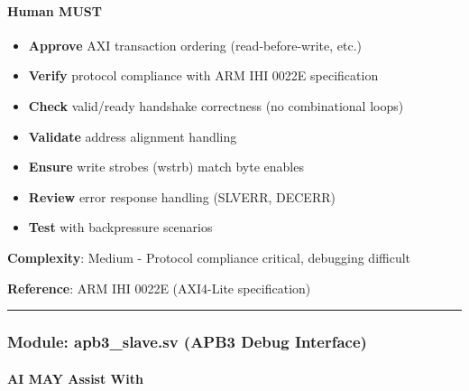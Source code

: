 \paragraph{\texorpdfstring{\hold{} Human MUST}{ Human MUST}}\label{cr:status:phase1-ai-human-responsibilities:raised-hand-human-must-6}

\begin{record}

\begin{itemize}
\tightlist
\item
  \textbf{Approve} AXI transaction ordering (read-before-write, etc.)
\item
  \textbf{Verify} protocol compliance with ARM IHI 0022E specification
\item
  \textbf{Check} valid/\allowbreak{}ready handshake correctness (no
  combinational loops)
\item
  \textbf{Validate} address alignment handling
\item
  \textbf{Ensure} write strobes (wstrb) match byte enables
\item
  \textbf{Review} error response handling (SLVERR, DECERR)
\item
  \textbf{Test} with backpressure scenarios
\end{itemize}

\textbf{Complexity}: \partialmark{} Medium - Protocol compliance
critical, debugging difficult

\textbf{Reference}: ARM IHI 0022E (AXI4-Lite specification)

\begin{center}\rule{0.5\linewidth}{0.5pt}\end{center}

\end{record}

\subsubsection{\texorpdfstring{Module: apb3\_\allowbreak{}slave.sv (APB3
Debug Interface)}{Module: apb3\_slave.sv (APB3 Debug Interface)}}\label{cr:status:phase1-ai-human-responsibilities:module-apb3-slavesv-apb3-debug-interface}

\paragraph{\texorpdfstring{\ok{} AI MAY Assist
With}{ AI MAY Assist With}}\label{cr:status:phase1-ai-human-responsibilities:white-check-mark-ai-may-assist-with-7}

